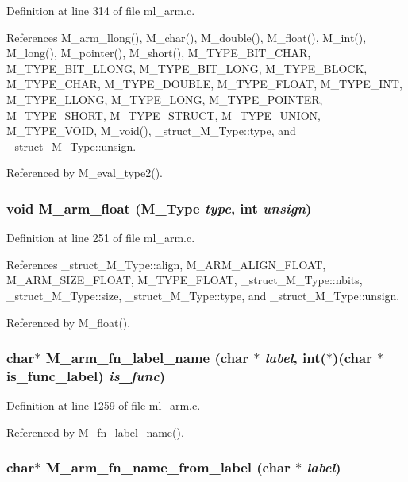 Definition at line 314 of file ml\_\-arm.c.

References M\_\-arm\_\-llong(), M\_\-char(), M\_\-double(), M\_\-float(), M\_\-int(), M\_\-long(), M\_\-pointer(), M\_\-short(), M\_\-TYPE\_\-BIT\_\-CHAR, M\_\-TYPE\_\-BIT\_\-LLONG, M\_\-TYPE\_\-BIT\_\-LONG, M\_\-TYPE\_\-BLOCK, M\_\-TYPE\_\-CHAR, M\_\-TYPE\_\-DOUBLE, M\_\-TYPE\_\-FLOAT, M\_\-TYPE\_\-INT, M\_\-TYPE\_\-LLONG, M\_\-TYPE\_\-LONG, M\_\-TYPE\_\-POINTER, M\_\-TYPE\_\-SHORT, M\_\-TYPE\_\-STRUCT, M\_\-TYPE\_\-UNION, M\_\-TYPE\_\-VOID, M\_\-void(), \_\-struct\_\-M\_\-Type::type, and \_\-struct\_\-M\_\-Type::unsign.

Referenced by M\_\-eval\_\-type2().
\subsubsection{\setlength{\rightskip}{0pt plus 5cm}void M\_\-arm\_\-float (\bf{M\_\-Type} {\em type}, int {\em unsign})}\label{m__arm_8h_44bd6fdd6aa344860f27f70f1893a2b6}




Definition at line 251 of file ml\_\-arm.c.

References \_\-struct\_\-M\_\-Type::align, M\_\-ARM\_\-ALIGN\_\-FLOAT, M\_\-ARM\_\-SIZE\_\-FLOAT, M\_\-TYPE\_\-FLOAT, \_\-struct\_\-M\_\-Type::nbits, \_\-struct\_\-M\_\-Type::size, \_\-struct\_\-M\_\-Type::type, and \_\-struct\_\-M\_\-Type::unsign.

Referenced by M\_\-float().
\subsubsection{\setlength{\rightskip}{0pt plus 5cm}char$\ast$ M\_\-arm\_\-fn\_\-label\_\-name (char $\ast$ {\em label}, int($\ast$)(char $\ast$is\_\-func\_\-label) {\em is\_\-func})}\label{m__arm_8h_ec976c50611bfcf2982cd6e04abca3a7}




Definition at line 1259 of file ml\_\-arm.c.

Referenced by M\_\-fn\_\-label\_\-name().
\subsubsection{\setlength{\rightskip}{0pt plus 5cm}char$\ast$ M\_\-arm\_\-fn\_\-name\_\-from\_\-label (char $\ast$ {\em label})}\label{m__arm_8h_1f1ec2f67c6cc20fca9edc19e6d280ad}




